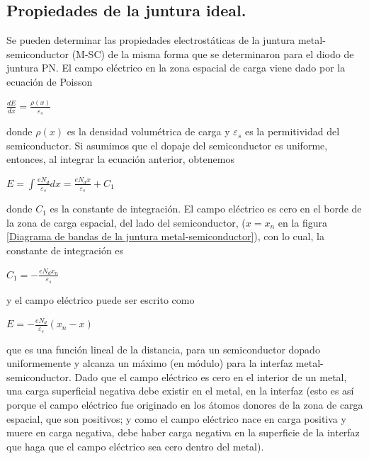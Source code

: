 \documentclass[oneside]{book}
\numberwithin{equation}{section}
\numberwithin{figure}{section}
\numberwithin{table}{section}
\begin{document}
			\subsection{Propiedades de la juntura ideal.}

			Se pueden determinar las propiedades electrostáticas de la juntura metal-semiconductor (M-SC) de la misma forma que se determinaron para el diodo de juntura PN. El campo eléctrico en la zona espacial de carga viene dado por la ecuación de Poisson
			
			\begin{center}
				$\frac{dE}{dx}=\frac{\rho(x)}{\varepsilon _{s}}$
			\end{center}

			donde $\rho (x)$ es la densidad volumétrica de carga y $\varepsilon_{s}$ es la permitividad del semiconductor. Si asumimos que el dopaje del semiconductor es uniforme, entonces, al integrar la ecuación anterior, obtenemos
			
			\begin{center}
				$E=\int \frac{eN_d}{\varepsilon_s}dx=\frac{eN_d x}{\varepsilon_s}+C_1$
			\end{center}
			
			donde $C_1$ es la constante de integración. El campo eléctrico es cero en el borde de la zona de carga espacial, del lado del semiconductor, ($x=x_n$ en la figura \ref{Diagrama de bandas de la juntura metal-semiconductor}), con lo cual, la constante de integración es
		
			\begin{center}	
				$C_1=-\frac{eN_d x_n}{\varepsilon_s}$
			\end{center}
			
			y el campo eléctrico puede ser escrito como
			
			\begin{center}
				$E=-\frac{eN_d}{\varepsilon_s}(x_n-x)$
			\end{center}

			que es una función lineal de la distancia, para un semiconductor dopado uniformemente y alcanza un máximo (en módulo) para la interfaz metal-semiconductor. Dado que el campo eléctrico es cero en el interior de un metal, una carga superficial negativa debe existir en el metal, en la interfaz (esto es así porque el campo eléctrico fue originado en los átomos donores de la zona de carga espacial, que son positivos; y como el campo eléctrico nace en carga positiva y muere en carga negativa, debe haber carga negativa en la superficie de la interfaz que haga que el campo eléctrico sea cero dentro del metal).
\end{document}

